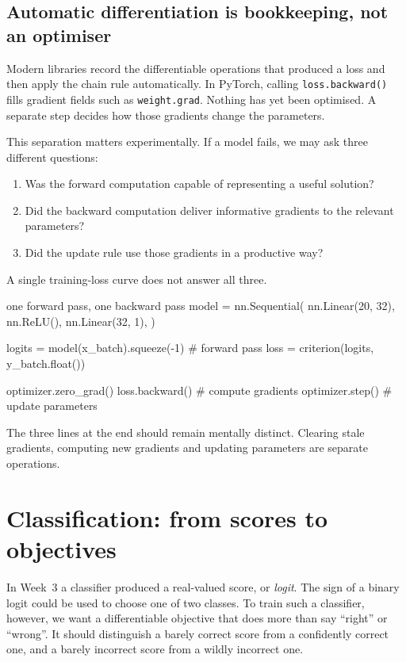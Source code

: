 \subsection{Automatic differentiation is bookkeeping, not an optimiser}

Modern libraries record the differentiable operations that produced a loss and then apply the chain rule automatically. In PyTorch, calling \texttt{loss.backward()} fills gradient fields such as \texttt{weight.grad}. Nothing has yet been optimised. A separate step decides how those gradients change the parameters.

This separation matters experimentally. If a model fails, we may ask three different questions:
\begin{enumerate}[leftmargin=*]
  \item Was the forward computation capable of representing a useful solution?
  \item Did the backward computation deliver informative gradients to the relevant parameters?
  \item Did the update rule use those gradients in a productive way?
\end{enumerate}
A single training-loss curve does not answer all three.

\begin{pytorchbox}{one forward pass, one backward pass}
model = nn.Sequential(
    nn.Linear(20, 32),
    nn.ReLU(),
    nn.Linear(32, 1),
)

logits = model(x_batch).squeeze(-1)       # forward pass
loss = criterion(logits, y_batch.float())

optimizer.zero_grad()
loss.backward()                           # compute gradients
optimizer.step()                          # update parameters
\end{pytorchbox}

The three lines at the end should remain mentally distinct. Clearing stale gradients, computing new gradients and updating parameters are separate operations.

\section{Classification: from scores to objectives}

In Week~3 a classifier produced a real-valued score, or \emph{logit}. The sign of a binary logit could be used to choose one of two classes. To train such a classifier, however, we want a differentiable objective that does more than say ``right'' or ``wrong''. It should distinguish a barely correct score from a confidently correct one, and a barely incorrect score from a wildly incorrect one.

